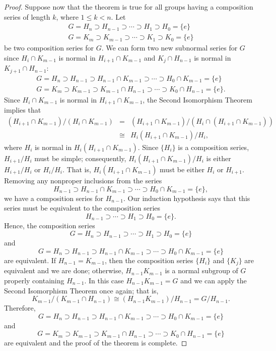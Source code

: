 \begin{proof}
 
Suppose now that the theorem is true for all groups having a
composition series of length $k$, where $1 \leq k <n$. Let 
\[
\begin{array}{c}
G = H_n \supset H_{n-1} \supset \cdots \supset H_1 \supset
H_0 = \{ e \} \\
G = K_m \supset K_{m-1} \supset \cdots \supset K_1 \supset
K_0 = \{ e \}
\end{array}
\]
be two composition series for $G$.  We can form two new subnormal
series for $G$ since $H_i \cap K_{m-1}$ is normal in $H_{i+1} \cap
K_{m-1}$ and $K_j \cap H_{n-1}$ is normal in $K_{j+1} \cap H_{n-1}$:
\[
\begin{array}{c}
G = H_n \supset H_{n-1} \supset H_{n-1} \cap K_{m-1} \supset 
\cdots \supset H_0 \cap K_{m-1} = \{ e \} \\
G = K_m \supset K_{m-1} \supset K_{m-1} \cap H_{n-1} \supset 
\cdots \supset K_0 \cap H_{n-1} = \{ e \}.
\end{array}
\]
Since $H_i \cap K_{m-1}$ is normal in $H_{i+1} \cap K_{m-1}$, the
Second Isomorphism Theorem implies that 
\begin{eqnarray*}
(H_{i+1} \cap K_{m-1}) / (H_i \cap K_{m-1}) 
& = & (H_{i+1} \cap K_{m-1}) / (H_i \cap ( H_{i+1} \cap K_{m-1} )) \\
& \cong & H_i (H_{i+1} \cap K_{m-1})/ H_i,
\end{eqnarray*}
where $H_i$ is normal in $H_i (H_{i+1} \cap K_{m-1})$. Since $\{ H_i
\}$  is a composition series, $H_{i+1} / H_i$ must be simple;
consequently, $H_i (H_{i+1} \cap K_{m-1})/ H_i$ is either $H_{i+1}/
H_i$ or $H_i/H_i$.  That is, $H_i (H_{i+1} \cap K_{m-1})$ must be
either $H_i$ or $H_{i+1}$. Removing any nonproper inclusions from the
series 
\[
H_{n-1} \supset H_{n-1} \cap K_{m-1} \supset 
\cdots \supset H_0 \cap K_{m-1} = \{ e \}, 
\]
we have a composition series for $H_{n-1}$. Our induction hypothesis
says that this series must be equivalent to the composition series
\[
H_{n-1} \supset \cdots \supset H_1 \supset H_0 = \{ e \}.
\]
Hence, the composition series
\[
G = H_n \supset H_{n-1} \supset \cdots \supset H_1 \supset
H_0 = \{ e \} 
\]
and 
\[
G = H_n \supset H_{n-1} \supset H_{n-1} \cap K_{m-1} \supset 
\cdots \supset H_0 \cap K_{m-1} = \{ e \} 
\]
are equivalent. If $H_{n-1} = K_{m-1}$, then the composition series
$\{H_i \}$ and $\{ K_j \}$ are equivalent and we are done; otherwise,
$H_{n-1} K_{m-1}$  is a normal subgroup of $G$ properly containing
$H_{n-1}$.  In this case $H_{n-1} K_{m-1} = G$ and we can apply the
Second Isomorphism Theorem once again; that is,
\[
K_{m-1} / (K_{m-1} \cap H_{n-1}) \cong (H_{n-1} K_{m-1}) / H_{n-1} =
G/H_{n-1}.
\]
Therefore,
\[
G = H_n \supset H_{n-1} \supset H_{n-1} \cap K_{m-1} \supset 
\cdots \supset H_0 \cap K_{m-1} = \{ e \}
\]
and 
\[
G = K_m \supset K_{m-1} \supset K_{m-1} \cap H_{n-1} \supset 
\cdots \supset K_0 \cap H_{n-1} = \{ e \}
\]
are equivalent and the proof of the theorem is complete.
\end{proof}
 
